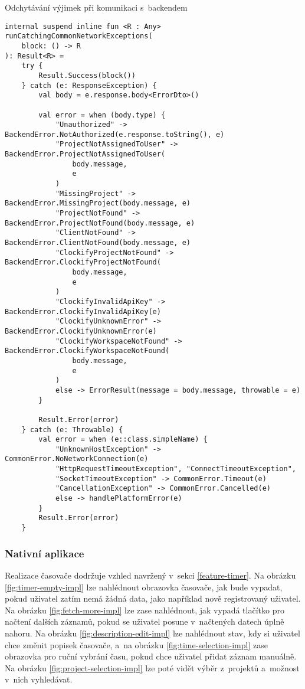 \begin{listing}
\caption{Odchytávání výjimek při komunikaci s~backendem}\label{code:kmp-run-catching-common-network-exceptions}
\begin{verbatim}
internal suspend inline fun <R : Any> runCatchingCommonNetworkExceptions(
    block: () -> R
): Result<R> =
    try {
        Result.Success(block())
    } catch (e: ResponseException) {
        val body = e.response.body<ErrorDto>()

        val error = when (body.type) {
            "Unauthorized" -> BackendError.NotAuthorized(e.response.toString(), e)
            "ProjectNotAssignedToUser" -> BackendError.ProjectNotAssignedToUser(
                body.message,
                e
            )
            "MissingProject" -> BackendError.MissingProject(body.message, e)
            "ProjectNotFound" -> BackendError.ProjectNotFound(body.message, e)
            "ClientNotFound" -> BackendError.ClientNotFound(body.message, e)
            "ClockifyProjectNotFound" -> BackendError.ClockifyProjectNotFound(
                body.message, 
                e
            )
            "ClockifyInvalidApiKey" -> BackendError.ClockifyInvalidApiKey(e)
            "ClockifyUnknownError" -> BackendError.ClockifyUnknownError(e)
            "ClockifyWorkspaceNotFound" -> BackendError.ClockifyWorkspaceNotFound(
                body.message,
                e
            )
            else -> ErrorResult(message = body.message, throwable = e)
        }

        Result.Error(error)
    } catch (e: Throwable) {
        val error = when (e::class.simpleName) {
            "UnknownHostException" -> CommonError.NoNetworkConnection(e)
            "HttpRequestTimeoutException", "ConnectTimeoutException",
            "SocketTimeoutException" -> CommonError.Timeout(e)
            "CancellationException" -> CommonError.Cancelled(e)
            else -> handlePlatformError(e)
        }
        Result.Error(error)
    }
\end{verbatim}
\end{listing}

\subsubsection{Nativní aplikace}

Realizace časovače dodržuje vzhled navržený v~sekci \ref{feature-timer}. Na obrázku \ref{fig:timer-empty-impl} lze nahlédnout obrazovka časovače, jak bude vypadat, pokud uživatel zatím nemá žádná data, jako například nově registrovaný uživatel. Na obrázku \ref{fig:fetch-more-impl} lze zase nahlédnout, jak vypadá tlačítko pro načtení dalších záznamů, pokud se uživatel posune v~načtených datech úplně nahoru. Na obrázku \ref{fig:description-edit-impl} lze nahlédnout stav, kdy si uživatel chce změnit popisek časovače, a~na obrázku \ref{fig:time-selection-impl} zase obrazovka pro ruční vybrání času, pokud chce uživatel přidat záznam manuálně. Na obrázku \ref{fig:project-selection-impl} lze poté vidět výběr z~projektů a~možnost v~nich vyhledávat.

